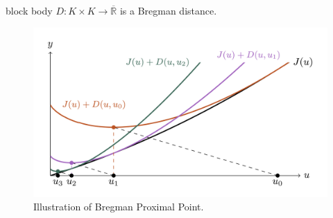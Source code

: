 \documentclass[aspectratio=169,xcolor=dvipsnames,11pt]{beamer}
\begin{document}
\begin{frame}
{\begin{minipage}{0.5\textwidth}
\begin{beamercolorbox}[rounded=true, shadow=true, wd=\textwidth]{block body}
$D : K \times K \to \overline{\mathbb R}$ is a \alert{Bregman distance.}
\end{beamercolorbox}
\end{minipage}%
\begin{minipage}{0.5\textwidth}
\begin{figure}[h]
\includegraphics[width=0.8\linewidth]{figures/Prox.png}
\caption{Illustration of Bregman Proximal Point.} 
\end{figure}
\end{minipage}
}
\end{frame}
\end{document}
